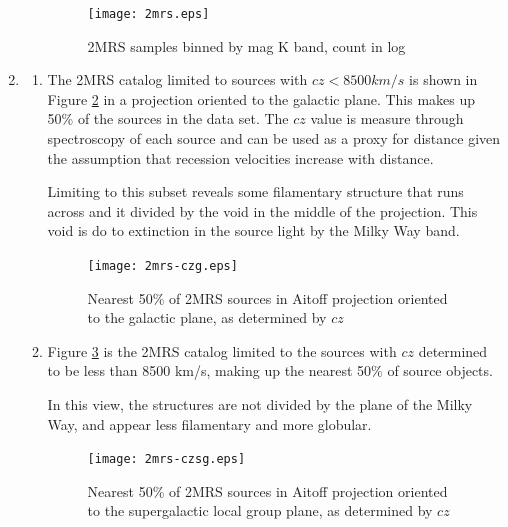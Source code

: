 \documentclass{paper}
\begin{document}
\begin{enumerate}
\begin{enumerate}
        \begin{figure}
          \texttt{[image: 2mrs.eps]}
          \caption{2MRS samples binned by mag K band, count in log}
          \label{fig:2mrs-bins}
        \end{figure}

    \end{enumerate}
  \pagebreak \item
    \begin{enumerate}
      \item
        The 2MRS catalog limited to sources with $cz < 8500 km/s$ is shown in
        Figure \ref{fig:2mrs-czg} in a projection oriented to the galactic
        plane. This makes up 50\% of the sources in the data set. The 
        $cz$ value is measure through spectroscopy of each source and can be
        used as a proxy for distance given the assumption that recession
        velocities increase with distance.

        Limiting to this subset reveals some filamentary structure that runs 
        across and it divided by the void in the middle of the projection. 
        This void is do to extinction in the source light by the Milky Way 
        band.

        \begin{figure}
          \texttt{[image: 2mrs-czg.eps]}
          \caption{Nearest 50\% of 2MRS sources in Aitoff projection 
            oriented to the galactic plane, as determined by $cz$}
          \label{fig:2mrs-czg}
        \end{figure}
    
      \item
        Figure \ref{fig:2mrs-czsg} is the 2MRS catalog limited to the sources 
        with $cz$ determined to be less than 8500 km/s, making up the nearest
        50\% of source objects. 

        In this view, the structures are not divided by the plane of the
        Milky Way, and appear less filamentary and more globular.
        \begin{figure}
          \texttt{[image: 2mrs-czsg.eps]}
          \caption{Nearest 50\% of 2MRS sources in Aitoff projection 
            oriented to the supergalactic local group plane, as determined 
            by $cz$}
          \label{fig:2mrs-czsg}
        \end{figure}
    \end{enumerate}
\end{enumerate}

\pagebreak


\end{document}
